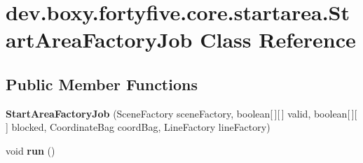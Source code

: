 \hypertarget{classdev_1_1boxy_1_1fortyfive_1_1core_1_1startarea_1_1_start_area_factory_job}{
\section{dev.boxy.fortyfive.core.startarea.StartAreaFactoryJob Class Reference}
\label{d4/d36/classdev_1_1boxy_1_1fortyfive_1_1core_1_1startarea_1_1_start_area_factory_job}
}
\subsection*{Public Member Functions}
\begin{DoxyCompactItemize}
\item 
\hypertarget{classdev_1_1boxy_1_1fortyfive_1_1core_1_1startarea_1_1_start_area_factory_job_a7034c718e988c039f2ea047bcba34989}{
{\bfseries StartAreaFactoryJob} (SceneFactory sceneFactory, boolean\mbox{[}$\,$\mbox{]}\mbox{[}$\,$\mbox{]} valid, boolean\mbox{[}$\,$\mbox{]}\mbox{[}$\,$\mbox{]} blocked, CoordinateBag coordBag, LineFactory lineFactory)}
\label{d4/d36/classdev_1_1boxy_1_1fortyfive_1_1core_1_1startarea_1_1_start_area_factory_job_a7034c718e988c039f2ea047bcba34989}

\item 
\hypertarget{classdev_1_1boxy_1_1fortyfive_1_1core_1_1startarea_1_1_start_area_factory_job_acf18a4724eaccd63f3149eb0e6b63d2c}{
void {\bfseries run} ()}
\label{d4/d36/classdev_1_1boxy_1_1fortyfive_1_1core_1_1startarea_1_1_start_area_factory_job_acf18a4724eaccd63f3149eb0e6b63d2c}

\end{DoxyCompactItemize}
